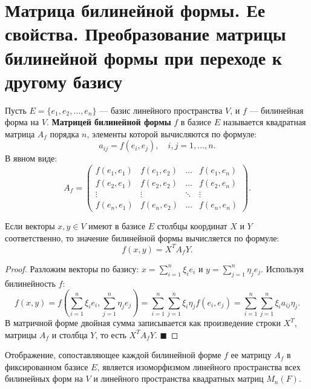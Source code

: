 \section{Матрица билинейной формы. Ее свойства. Преобразование матрицы билинейной формы при переходе к другому базису}

\begin{definition}
Пусть $E = \{e_1, e_2, \dots, e_n\}$ --- базис линейного пространства $V$, и $f$ --- билинейная форма на $V$. \textbf{Матрицей билинейной формы} $f$ в базисе $E$ называется квадратная матрица $A_f$ порядка $n$, элементы которой вычисляются по формуле:
\[
a_{ij} = f(e_i, e_j), \quad i, j = 1, \dots, n.
\]
В явном виде:
\[
A_f = \begin{pmatrix}
f(e_1, e_1) & f(e_1, e_2) & \dots & f(e_1, e_n) \\
f(e_2, e_1) & f(e_2, e_2) & \dots & f(e_2, e_n) \\
\vdots & \vdots & \ddots & \vdots \\
f(e_n, e_1) & f(e_n, e_2) & \dots & f(e_n, e_n)
\end{pmatrix}.
\]
\end{definition}

\begin{theorem}
Если векторы $x, y \in V$ имеют в базисе $E$ столбцы координат $X$ и $Y$ соответственно, то значение билинейной формы вычисляется по формуле:
\[
f(x, y) = X^T A_f Y.
\]
\end{theorem}

\begin{proof}
Разложим векторы по базису: $x = \sum_{i=1}^n \xi_i e_i$ и $y = \sum_{j=1}^n \eta_j e_j$. Используя билинейность $f$:
\[
f(x, y) = f\left(\sum_{i=1}^n \xi_i e_i, \sum_{j=1}^n \eta_j e_j\right) = \sum_{i=1}^n \sum_{j=1}^n \xi_i \eta_j f(e_i, e_j) = \sum_{i=1}^n \sum_{j=1}^n \xi_i a_{ij} \eta_j.
\]
В матричной форме двойная сумма записывается как произведение строки $X^T$, матрицы $A_f$ и столбца $Y$, то есть $X^T A_f Y$.
\hfill$\blacksquare$
\end{proof}

\begin{theorem}
Отображение, сопоставляющее каждой билинейной форме $f$ ее матрицу $A_f$ в фиксированном базисе $E$, является изоморфизмом линейного пространства всех билинейных форм на $V$ и линейного пространства квадратных матриц $M_n(F)$.
\end{theorem}

